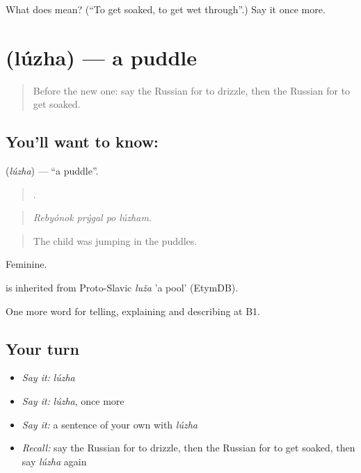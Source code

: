 \begin{tcolorbox}[breakable,colback=teal!4,colframe=teal!35!black,title={Before you move on}]
What does  mean? (\textquotedblleft{}To get soaked, to get wet through\textquotedblright{}.) Say it once more.
\end{tcolorbox}
\section[\texorpdfstring{\ru{лужа} (lúzha)}{лужа (lúzha)}]{ (lúzha) — a puddle}

\label{lesson:RU-C465-luzha}



\begin{quote}
Before the new one: say the Russian for to drizzle, then the Russian for to get soaked.
\end{quote}

\subsection*{You'll want to know: }
\textbf{} (\emph{lúzha}) — \textquotedblleft{}a puddle\textquotedblright{}.

\begin{quote}
   .
\end{quote}

\begin{quote}
\emph{Rebyónok prýgal po lúzham.}
\end{quote}

\begin{quote}
The child was jumping in the puddles.
\end{quote}

Feminine.

\begin{cousinweb}
\emph{} is inherited from Proto-Slavic \emph{luža} 'a pool' (EtymDB).
\end{cousinweb}

\begin{grammarlens}[title={What you've built}]
One more word for telling, explaining and describing at B1.
\end{grammarlens}

\subsection*{Your turn}
\begin{itemize}
\raggedright
  \item \emph{Say it:} \emph{lúzha}
  \item \emph{Say it:} \emph{lúzha}, once more
  \item \emph{Say it:} a sentence of your own with \emph{lúzha}
  \item \emph{Recall:} say the Russian for to drizzle, then the Russian for to get soaked, then say \emph{lúzha} again
\end{itemize}

